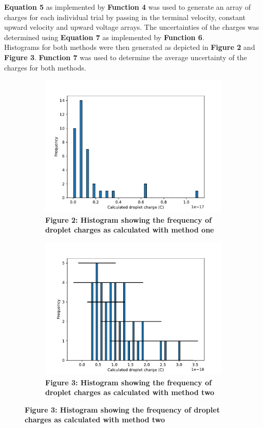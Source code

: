 \documentclass[
	letterpaper, %
	10pt, %
]{CSUniSchoolLabReport}
\begin{document}
\textbf{Equation 5} as implemented by \textbf{Function 4} was used to generate an array of charges for
each individual trial by passing in the terminal velocity, constant upward velocity and upward voltage
arrays. The uncertainties of the charges was determined using \textbf{Equation 7} as implemented by
\textbf{Function 6}.\\

Histograms for both methods were then generated as depicted in \textbf{Figure 2} and \textbf{Figure 3}.
\textbf{Function 7} was used to determine the average uncertainty of the charges for both methods.\\

\begin{figure}[H]
	\begin{subfigure}{0.45\textwidth}
		\includegraphics[width=\textwidth]{../figures/methodOneHistogram.pdf}
		\caption{\textbf{Figure 2: Histogram showing the frequency of droplet charges as calculated with method one}}
	\end{subfigure}\hfill
	\begin{subfigure}{0.45\textwidth}
		\includegraphics[width=\textwidth]{../figures/methodTwoHistogram.pdf}
		\caption{\textbf{Figure 3: Histogram showing the frequency of droplet charges as calculated with method two}}
	\end{subfigure}
\end{figure}
\end{document}
